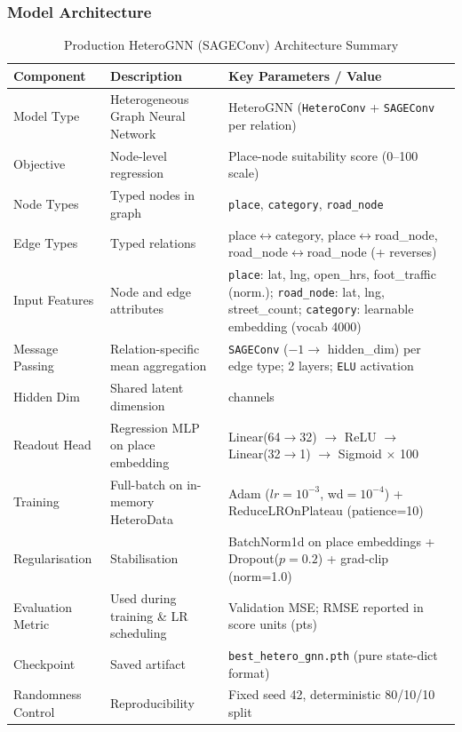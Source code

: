 \subsubsection{Model Architecture}
\begin{table}[htbp]
\centering
\caption{Production HeteroGNN (SAGEConv) Architecture Summary}
\label{tab:heterogat-arch}
\small
\setlength{\tabcolsep}{4pt}
\begin{tabular}{>{\raggedright\arraybackslash}p{} >{\raggedright\arraybackslash}p{} >{\raggedright\arraybackslash}p{}}
\toprule
\textbf{Component} & \textbf{Description} & \textbf{Key Parameters / Value} \\
\midrule
Model Type & Heterogeneous Graph Neural Network & HeteroGNN (\texttt{HeteroConv} + \texttt{SAGEConv} per relation) \\
Objective & Node-level regression & Place-node suitability score (0--100 scale) \\
Node Types & Typed nodes in graph & \texttt{place}, \texttt{category}, \texttt{road\_node} \\
Edge Types & Typed relations & place$\leftrightarrow$category, place$\leftrightarrow$road\_node, road\_node$\leftrightarrow$road\_node (+ reverses) \\
\midrule
Input Features & Node and edge attributes & \texttt{place}: lat, lng, open\_hrs, foot\_traffic (norm.); \texttt{road\_node}: lat, lng, street\_count; \texttt{category}: learnable embedding (vocab 4000) \\
\midrule
Message Passing & Relation-specific mean aggregation & \texttt{SAGEConv} ($-1 \to$ hidden\_dim) per edge type; 2 layers; \texttt{ELU} activation \\
\midrule
Hidden Dim & Shared latent dimension & 64 channels \\
\midrule
Readout Head & Regression MLP on place embedding & Linear(64$\to$32) $\to$ ReLU $\to$ Linear(32$\to$1) $\to$ Sigmoid $\times$ 100 \\
\midrule
Training & Full-batch on in-memory HeteroData & Adam ($lr=10^{-3}$, wd$=10^{-4}$) + ReduceLROnPlateau (patience=10) \\
\midrule
Regularisation & Stabilisation & BatchNorm1d on place embeddings + Dropout($p=0.2$) + grad-clip (norm=1.0) \\
\midrule
Evaluation Metric & Used during training \& LR scheduling & Validation MSE; RMSE reported in score units (pts) \\
\midrule
Checkpoint & Saved artifact & \texttt{best\_hetero\_gnn.pth} (pure state-dict format) \\
\midrule
Randomness Control & Reproducibility & Fixed seed 42, deterministic 80/10/10 split \\
\bottomrule
\end{tabular}
\end{table}


